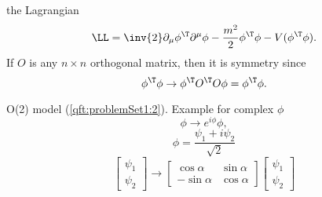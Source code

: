 the Lagrangian
\begin{equation}\label{eqn:qftLecture6:960}
\LL = \inv{2} \partial_\mu \phi^\T \partial^\mu \phi - \frac{m^2}{2} \phi^\T \phi - V(\phi^\T \phi).
\end{equation}
If \( O \) is any \( n \times n \) orthogonal matrix, then it is symmetry since
\begin{equation}\label{eqn:qftLecture6:980}
\phi^\T \phi \rightarrow \phi^\T O^\T O \phi = \phi^\T \phi.
\end{equation}

O(2) model (\cref{qft:problemSet1:2}).  Example for complex \( \phi \)
\begin{equation}\label{eqn:qftLecture6:1000}
\phi \rightarrow e^{i \phi} \phi,
\end{equation}
\begin{equation}\label{eqn:qftLecture6:1020}
\phi = \frac{\psi_1 + i \psi_2}{\sqrt{2}}
\end{equation}
\begin{equation}\label{eqn:qftLecture6:1040}
\begin{bmatrix}
\psi_1 \\
\psi_2
\end{bmatrix}
\rightarrow
\begin{bmatrix}
\cos\alpha & \sin\alpha \\
-\sin\alpha & \cos\alpha
\end{bmatrix}
\begin{bmatrix}
\psi_1 \\
\psi_2
\end{bmatrix}
\end{equation}

